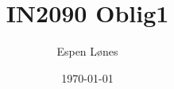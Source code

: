 \documentclass[12pt, letterpaper, twoside]{article}
\begin{document}
\title{IN2090 Oblig1}
\author{Espen Lønes}
\date{\today}
\maketitle
\end{document}
